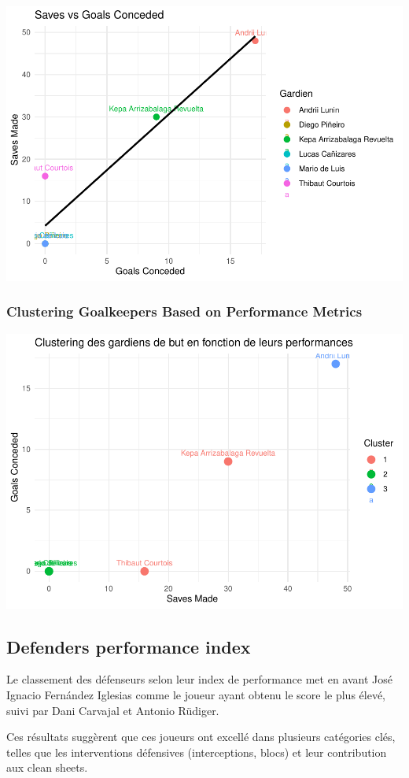 \documentclass[
  6pt,
]{article}
\begin{document}
\includegraphics[width=0.8\linewidth]{Analyse_Impact_Performances_Joueurs_files/figure-latex/SavesVsBEGardiern-1}

\subsubsection{Clustering Goalkeepers Based on Performance
Metrics}\label{clustering-goalkeepers-based-on-performance-metrics}

\includegraphics[width=0.8\linewidth]{Analyse_Impact_Performances_Joueurs_files/figure-latex/clustering-1}

\subsection{Defenders performance
index}\label{defenders-performance-index}

Le classement des défenseurs selon leur index de performance met en
avant José Ignacio Fernández Iglesias comme le joueur ayant obtenu le
score le plus élevé, suivi par Dani Carvajal et Antonio Rüdiger.

Ces résultats suggèrent que ces joueurs ont excellé dans plusieurs
catégories clés, telles que les interventions défensives (interceptions,
blocs) et leur contribution aux clean sheets.
\end{document}
